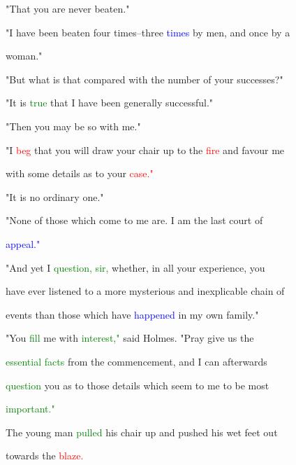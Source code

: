  "That you are never beaten."



 "I have been beaten four times--three \textcolor{blue}{times} by men, and once by a

 woman."



 "But what is that compared with the number of your \textcolor{BurntOrange}{successes?"}



 "It is \textcolor{green}{true} that I have been generally \textcolor{BurntOrange}{successful."}



 "Then you may be so with me."



 "I \textcolor{red}{beg} that you will draw your chair up to the \textcolor{red}{fire} and favour me

 with some details as to your \textcolor{red}{case."}



 "It is no ordinary one."



 "None of those which come to me are. I am the last \textcolor{BurntOrange}{court} of

 \textcolor{blue}{appeal."}



 "And yet I \textcolor{green}{question,} \textcolor{green}{sir,} whether, in all your experience, you

 have ever listened to a more \textcolor{BurntOrange}{mysterious} and \textcolor{BurntOrange}{inexplicable} chain of

 events than those which have \textcolor{blue}{happened} in my own family."



 "You \textcolor{green}{fill} me with \textcolor{green}{interest,"} said Holmes. \textcolor{BurntOrange}{"Pray} give us the

 \textcolor{green}{essential} \textcolor{green}{facts} from the commencement, and I can afterwards

 \textcolor{green}{question} you as to those details which seem to me to be most

 \textcolor{green}{important."}



 The \textcolor{BurntOrange}{young} man \textcolor{green}{pulled} his chair up and pushed his wet feet out

 towards the \textcolor{red}{blaze.}



